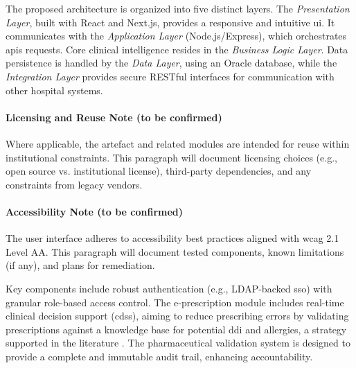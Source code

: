 The proposed architecture is organized into five distinct layers. The \textit{Presentation Layer}, built with React and Next.js, provides a responsive and intuitive \gls{ui}. It communicates with the \textit{Application Layer} (Node.js/\-Express), which orchestrates \glspl{api} requests. Core clinical intelligence resides in the \textit{Business Logic Layer}. Data persistence is handled by the \textit{Data Layer}, using an Oracle database, while the \textit{Integration Layer} provides secure RESTful interfaces for communication with other hospital systems.

\paragraph{Licensing and Reuse Note (to be confirmed)}
Where applicable, the artefact and related modules are intended for reuse within institutional constraints. This paragraph will document licensing choices (e.g., open source vs. institutional license), third-party dependencies, and any constraints from legacy vendors.

\paragraph{Accessibility Note (to be confirmed)}
The user interface adheres to accessibility best practices aligned with \gls{wcag} 2.1 Level AA. This paragraph will document tested components, known limitations (if any), and plans for remediation.

Key components include robust authentication (e.g., LDAP-backed \gls{sso}) with granular role-based access control. The e-prescription module includes real-time clinical decision support (\gls{cdss}), aiming to reduce prescribing errors by validating prescriptions against a knowledge base for potential \gls{ddi} and allergies, a strategy supported in the literature \cite{bates2014}. The pharmaceutical validation system is designed to provide a complete and immutable audit trail, enhancing accountability.

